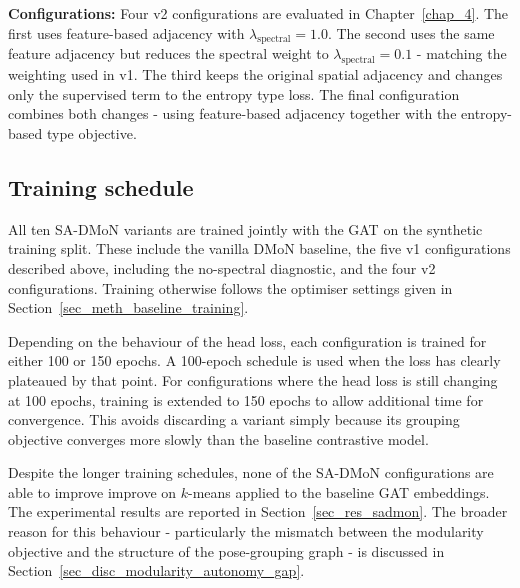 \textbf{Configurations:}
Four v2 configurations are evaluated in Chapter~\ref{chap_4}.
The first uses feature-based adjacency with
$\lambda_{\text{spectral}}=1.0$.
The second uses the same feature adjacency
but reduces the spectral weight to
$\lambda_{\text{spectral}}=0.1$ -
matching the weighting used in v1.
The third keeps the original spatial adjacency
and changes only the supervised term to the entropy type loss.
The final configuration combines both changes -
using feature-based adjacency together with the
entropy-based type objective.

\subsection{Training schedule}
\label{sec_meth_sadmon_training}

All ten SA-DMoN variants are trained jointly with the GAT on the
synthetic training split.
These include the vanilla DMoN baseline,
the five v1 configurations described above,
including the no-spectral diagnostic,
and the four v2 configurations.
Training otherwise follows the optimiser settings given in
Section~\ref{sec_meth_baseline_training}.

Depending on the behaviour of the head loss,
each configuration is trained for either 100 or 150 epochs.
A 100-epoch schedule is used when the loss has clearly plateaued
by that point.
For configurations where the head loss is still changing at 100 epochs,
training is extended to 150 epochs
to allow additional time for convergence.
This avoids discarding a variant simply because its grouping objective
converges more slowly than the baseline contrastive model.

Despite the longer training schedules,
none of the SA-DMoN configurations are able to improve
improve on $k$-means applied to the baseline GAT embeddings.
The experimental results are reported in
Section~\ref{sec_res_sadmon}.
The broader reason for this behaviour -
particularly the mismatch between the modularity objective
and the structure of the pose-grouping graph -
is discussed in Section~\ref{sec_disc_modularity_autonomy_gap}.
